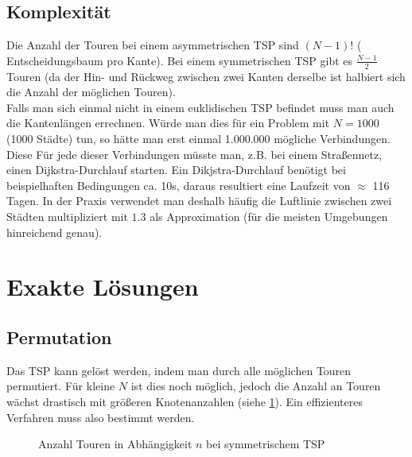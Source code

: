\documentclass[a4paper, 11pt]{article}
\begin{document}
\subsection{Komplexität}

Die Anzahl der Touren bei einem asymmetrischen TSP sind $(N - 1)!$ (
Entscheidungsbaum pro Kante). Bei einem symmetrischen TSP gibt es
$\frac{N - 1}{2}$ Touren (da der Hin- und Rückweg zwischen zwei Kanten
derselbe ist halbiert sich die Anzahl der möglichen Touren).\\

Falls man sich einmal nicht in einem euklidischen TSP befindet muss man
auch die Kantenlängen errechnen. Würde man dies für ein Problem mit
$N = 1000$ (1000 Städte) tun, so hätte man erst einmal 1.000.000 mögliche
Verbindungen. Diese Für jede dieser Verbindungen müsste man, z.B. bei einem
Straßennetz, einen Dijkstra-Durchlauf starten. Ein Dikjstra-Durchlauf benötigt
bei beispielhaften Bedingungen ca. 10s, daraus resultiert eine Laufzeit von $\approx$
116 Tagen. In der Praxis verwendet man deshalb häufig die Luftlinie zwischen
zwei Städten multipliziert mit $1.3$ als Approximation (für die meisten
Umgebungen hinreichend genau).

\section{Exakte Lösungen}

\subsection{Permutation}

Das TSP kann gelöst werden, indem man durch alle möglichen Touren permutiert.
Für kleine $N$ ist dies noch möglich, jedoch die Anzahl an Touren wächst
drastisch mit größeren Knotenanzahlen (siehe \ref{fig:faculty_graph}). Ein
effizienteres Verfahren muss also bestimmt werden.

\begin{figure}
  \centering
  \label{fig:faculty_graph}
  \caption{Anzahl Touren in Abhängigkeit $n$ bei symmetrischem TSP}
\end{figure}
\end{document}
